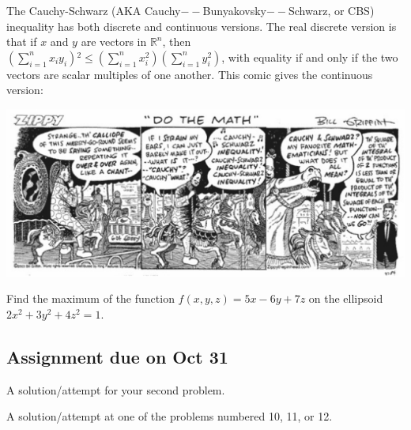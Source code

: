\documentclass{article}
\begin{document}
The Cauchy-Schwarz (AKA Cauchy$--$Bunyakovsky$--$Schwarz, or CBS) inequality has both discrete and continuous versions. { }The real discrete version
is that if \(x\) and \(y\) are vectors in \(\mathbb{R}^n\), then { }\(\left(\sum _{i=1}^n x_i y_i\right){}^2\leq \left(\sum _{i=1}^n x_i^2\right)\left(
\sum _{i=1}^n y_i^2\right)\), with equality if and only if the two vectors are scalar multiples of one another. { } This comic gives the continuous
version:

\includegraphics{92.420_inequalities_2018_gr1.eps}

Find the maximum of the function \(f(x,y,z)=5x -6y+7z\) on the ellipsoid \(2x^2+3y^2+4z^2=1\).


\subsection{Assignment due on Oct 31}


\item A solution/attempt for your second problem.


\item A solution/attempt at one of the problems numbered 10, 11, or 12.
\end{document}
